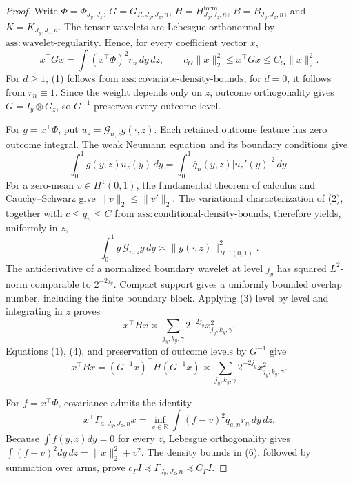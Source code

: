 \documentclass{article}
\begin{document}
\begin{proof}
Write \(\Phi=\Phi_{J_y,J_z}\), \(G=G_{R,J_y,J_z,n}\), \(H=H^{\mathrm{form}}_{J_y,J_z,n}\), \(B=B_{J_y,J_z,n}\), and \(K=K_{J_y,J_z,n}\).  The tensor wavelets are Lebesgue-orthonormal by \(\mathrm{ass{:}wavelet\text{-}regularity}\).  Hence, for every coefficient vector \(x\),
\[
x^{\top}Gx=\int (x^{\top}\Phi)^2r_n\,dy\,dz,
\qquad c_G\|x\|_2^2\le x^{\top}Gx\le C_G\|x\|_2^2. \tag{1}
\]
For \(d\ge1\), (1) follows from \(\mathrm{ass{:}covariate\text{-}density\text{-}bounds}\); for \(d=0\), it follows from \(r_n\equiv1\).  Since the weight depends only on \(z\), outcome orthogonality gives \(G=I_y\otimes G_z\), so \(G^{-1}\) preserves every outcome level.

For \(g=x^{\top}\Phi\), put \(u_z=\mathcal G_{n,z}g(\cdot,z)\).  Each retained outcome feature has zero outcome integral.  The weak Neumann equation and its boundary conditions give
\[
\int_0^1g(y,z)u_z(y)\,dy
=\int_0^1\bar q_n(y,z)|u_z'(y)|^2\,dy. \tag{2}
\]
For a zero-mean \(v\in H^1(0,1)\), the fundamental theorem of calculus and Cauchy--Schwarz give \(\|v\|_2\le\|v'\|_2\).  The variational characterization of (2), together with \(c\le\bar q_n\le C\) from \(\mathrm{ass{:}conditional\text{-}density\text{-}bounds}\), therefore yields, uniformly in \(z\),
\[
\int_0^1g\,\mathcal G_{n,z}g\,dy\asymp
\|g(\cdot,z)\|_{H^{-1}(0,1)}^2. \tag{3}
\]
The antiderivative of a normalized boundary wavelet at level \(j_y\) has squared \(L^2\)-norm comparable to \(2^{-2j_y}\).  Compact support gives a uniformly bounded overlap number, including the finite boundary block.  Applying (3) level by level and integrating in \(z\) proves
\[
x^{\top}Hx\asymp
\sum_{j_y,k_y,\gamma}2^{-2j_y}x_{j_y,k_y,\gamma}^2. \tag{4}
\]
Equations (1), (4), and preservation of outcome levels by \(G^{-1}\) give
\[
x^{\top}Bx=(G^{-1}x)^{\top}H(G^{-1}x)
\asymp\sum_{j_y,k_y,\gamma}2^{-2j_y}x_{j_y,k_y,\gamma}^2. \tag{5}
\]

For \(f=x^{\top}\Phi\), covariance admits the identity
\[
x^{\top}\Gamma_{a,J_y,J_z,n}x
=\inf_{v\in\mathbb R}\int(f-v)^2q_{a,n}r_n\,dy\,dz. \tag{6}
\]
Because \(\int f(y,z)dy=0\) for every \(z\), Lebesgue orthogonality gives \(\int(f-v)^2dy\,dz=\|x\|_2^2+v^2\).  The density bounds in (6), followed by summation over arms, prove \(c_\Gamma I\preceq\Gamma_{J_y,J_z,n}\preceq C_\Gamma I\).


\end{proof}
\end{document}

